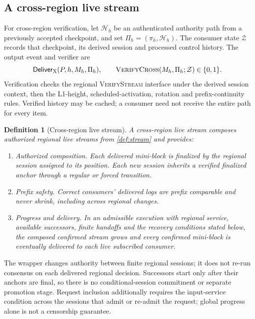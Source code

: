 \documentclass[11pt,a4paper,onecolumn]{article}
\newcommand{\Tag}[1]{\ensuremath{\mathsf{#1}}}
\newcommand{\Proc}[1]{\textnormal{\textsc{#1}}}
\newtheorem{definition}{Definition}[section]
\begin{document}
\subsection{A cross-region live stream}\label{sec:xstream}
For cross-region verification, let $\mathcal H_h$ be an authenticated
authority path from a previously accepted checkpoint, and set
$\Pi_h=(\pi_h,\mathcal H_h)$. The consumer state $\mathcal Z$ records that
checkpoint, its derived session and processed control history. The output
event and verifier are
\[
 \Tag{Deliver}_{\rm X}(P,h,M_h,\Pi_h),\qquad
 \Proc{VerifyCross}(M_h,\Pi_h;\mathcal Z)\in\{0,1\}.
\]
Verification checks the
regional \Proc{VerifyStream} interface under the derived session context,
then the L1-height, scheduled-activation, rotation and prefix-continuity
rules. Verified history
may be cached; a consumer need not receive the entire path for every item.

\begin{definition}[Cross-region live stream]\label{def:xstream}
A cross-region live stream composes authorized regional live streams from
\cref{def:stream} and provides:
\begin{enumerate}[label=(\roman*)]
\item \emph{Authorized composition.} Each delivered mini-block is finalized
by the regional session assigned to its position. Each new session inherits
a verified finalized anchor through a regular or forced transition.
\item \emph{Prefix safety.} Correct consumers' delivered logs are prefix
comparable and never shrink, including across regional changes.
\item \emph{Progress and delivery.} In an admissible execution with regional
service, available successors, finite handoffs and the recovery conditions
stated below, the composed confirmed stream grows and every confirmed
mini-block is eventually delivered to each live subscribed consumer.
\end{enumerate}
\end{definition}
The wrapper changes authority between finite regional sessions; it does not
re-run consensus on each delivered regional decision. Successors start
only after their anchors are final, so there is no conditional-session
commitment or separate promotion stage. Request inclusion additionally
requires the input-service condition across the sessions that admit or
re-admit the request; global progress alone is not a censorship guarantee.
\end{document}
